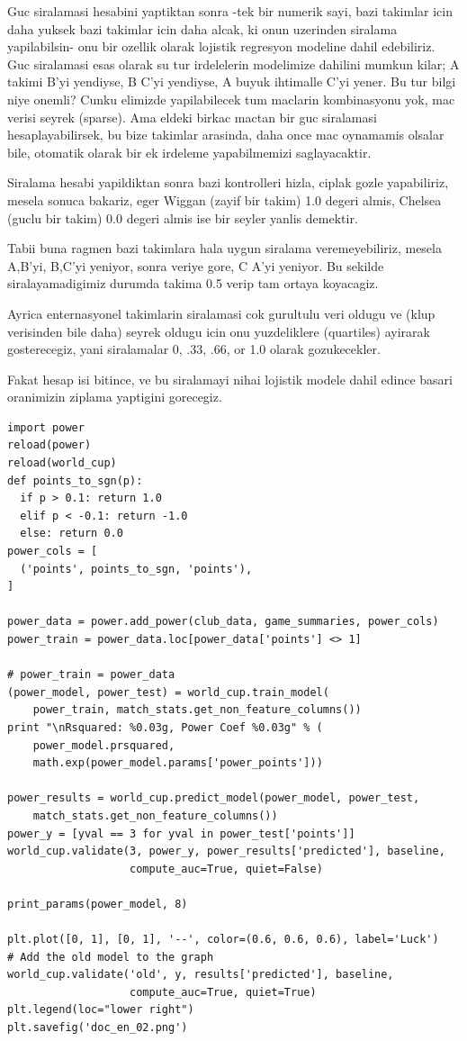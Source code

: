 \documentclass[12pt,fleqn]{article}\usepackage{../common}
\begin{document}
Guc siralamasi hesabini yaptiktan sonra -tek bir numerik sayi, bazi
takimlar icin daha yuksek bazi takimlar icin daha alcak, ki onun uzerinden
siralama yapilabilsin- onu bir ozellik olarak lojistik regresyon modeline
dahil edebiliriz. Guc siralamasi esas olarak su tur irdelelerin modelimize
dahilini mumkun kilar; A takimi B'yi yendiyse, B C'yi yendiyse, A buyuk
ihtimalle C'yi yener. Bu tur bilgi niye onemli?  Cunku elimizde
yapilabilecek tum maclarin kombinasyonu yok, mac verisi seyrek
(sparse). Ama eldeki birkac mactan bir guc siralamasi hesaplayabilirsek, bu
bize takimlar arasinda, daha once mac oynamamis olsalar bile, otomatik
olarak bir ek irdeleme yapabilmemizi saglayacaktir.

Siralama hesabi yapildiktan sonra bazi kontrolleri hizla, ciplak gozle
yapabiliriz, mesela sonuca bakariz, eger Wiggan (zayif bir takim) 1.0
degeri almis, Chelsea (guclu bir takim) 0.0 degeri almis ise bir seyler
yanlis demektir.

Tabii buna ragmen bazi takimlara hala uygun siralama veremeyebiliriz,
mesela A,B'yi, B,C'yi yeniyor, sonra veriye gore, C A'yi yeniyor. Bu
sekilde siralayamadigimiz durumda takima 0.5 verip tam ortaya koyacagiz.

Ayrica enternasyonel takimlarin siralamasi cok gurultulu veri oldugu ve
(klup verisinden bile daha) seyrek oldugu icin onu yuzdeliklere (quartiles)
ayirarak gosterecegiz, yani siralamalar 0, .33, .66, or 1.0 olarak
gozukecekler.

Fakat hesap isi bitince, ve bu siralamayi nihai lojistik modele dahil
edince basari oranimizin ziplama yaptigini gorecegiz.

\begin{verbatim}
import power
reload(power)
reload(world_cup)
def points_to_sgn(p):
  if p > 0.1: return 1.0
  elif p < -0.1: return -1.0
  else: return 0.0
power_cols = [
  ('points', points_to_sgn, 'points'),
]

power_data = power.add_power(club_data, game_summaries, power_cols)
power_train = power_data.loc[power_data['points'] <> 1] 

# power_train = power_data
(power_model, power_test) = world_cup.train_model(
    power_train, match_stats.get_non_feature_columns())
print "\nRsquared: %0.03g, Power Coef %0.03g" % (
    power_model.prsquared, 
    math.exp(power_model.params['power_points']))

power_results = world_cup.predict_model(power_model, power_test, 
    match_stats.get_non_feature_columns())
power_y = [yval == 3 for yval in power_test['points']]
world_cup.validate(3, power_y, power_results['predicted'], baseline, 
                   compute_auc=True, quiet=False)

print_params(power_model, 8)

plt.plot([0, 1], [0, 1], '--', color=(0.6, 0.6, 0.6), label='Luck')
# Add the old model to the graph
world_cup.validate('old', y, results['predicted'], baseline, 
                   compute_auc=True, quiet=True)
plt.legend(loc="lower right")
plt.savefig('doc_en_02.png')
\end{verbatim}
\end{document}
